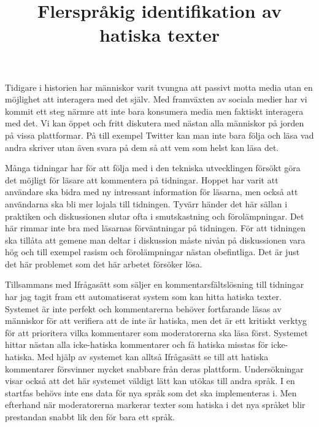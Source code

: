 \documentclass{popsci}
\title{Flerspråkig identifikation av hatiska texter}
\begin{document}


{\noindent Tidigare i historien har människor varit tvungna att passivt motta media utan en möjlighet att interagera med det själv. Med framväxten av sociala medier har vi kommit ett steg närmre att inte bara konsumera media men faktiskt interagera med det. Vi kan öppet och fritt diskutera med nästan alla människor på jorden på vissa plattformar. På till exempel Twitter kan man inte bara följa och läsa vad andra skriver utan även svara på dem så att vem som helst kan läsa det.

Många tidningar har för att följa med i den tekniska utvecklingen försökt göra det möjligt för läsare att kommentera på tidningar. Hoppet har varit att användare ska bidra med ny intressant information för läsarna, men också att användarna ska bli mer lojala till tidningen. Tyvärr händer det här sällan i praktiken och diskussionen slutar ofta i smutskastning och förolämpningar. Det här rimmar inte bra med läsarnas förväntningar på tidningen. För att tidningen ska tillåta att gemene man deltar i diskussion måste nivån på diskussionen vara hög och till exempel rasism och förolämpningar nästan obefintliga. Det är just det här problemet som det här arbetet försöker lösa.

Tillsammans med Ifrågasätt som säljer en kommentarsfältslösning till tidningar har jag tagit fram ett automatiserat system som kan hitta hatiska texter. Systemet är inte perfekt och kommentarerna behöver fortfarande läsas av människor för att verifiera att de inte är hatiska, men det är ett kritiskt verktyg för att prioritera vilka kommentarer som moderatorerna ska läsa först. Systemet hittar nästan alla icke-hatiska kommentarer och få hatiska misstas för icke-hatiska. Med hjälp av systemet kan alltså Ifrågasätt se till att hatiska kommentarer försvinner mycket snabbare från deras plattform. Undersökningar visar också att det här systemet väldigt lätt kan utökas till andra språk. I en startfas behövs inte ens data för nya språk som det ska implementeras i. Men efterhand när moderatorerna markerar texter som hatiska i det nya språket blir prestandan snabbt lik den för bara ett språk.

}
\end{document}
